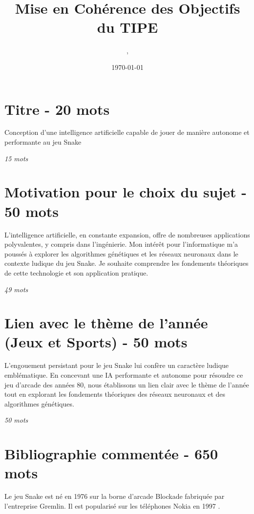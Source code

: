 \documentclass[11pt,a4paper]{article}
\author{\monNom, \maClasse}
\title{Mise en Cohérence des Objectifs du TIPE}
\date{\today}
\makeatletter
\renewcommand{\maketitle}{
  \thispagestyle{empty}
  \begin{center}
  \shadowbox{\parbox{5in}{%
     \centering%
     \textrm{\textbf{\Large \@title}}\\
     \vspace{0.2cm}
     \textrm{\large \@author}\\
     \vspace{0.2cm}
     \textrm{\large \@date}
  }} 
  \end{center}
  \null
}
\makeatother
\begin{document}
\maketitle

\tableofcontents

\thispagestyle{fancy}

\section{Titre - 20 mots}

\begin{center}
    Conception d'une intelligence artificielle capable de jouer de manière autonome et performante au jeu Snake  
\end{center}

\textit{15 mots}

\section{Motivation pour le choix du sujet - 50 mots}

L'intelligence artificielle, en constante expansion, offre de nombreuses applications polyvalentes, y compris dans l'ingénierie.
Mon intérêt pour l'informatique m'a poussés à explorer les algorithmes génétiques et les réseaux neuronaux dans le contexte ludique du jeu Snake.
Je souhaite comprendre les fondements théoriques de cette technologie et son application pratique.

\textit{49 mots}

\section{Lien avec le thème de l'année (Jeux et Sports) - 50 mots}

L'engouement persistant pour le jeu Snake lui confère un caractère ludique 
emblématique.
En concevant une IA performante et autonome pour résoudre ce jeu 
d'arcade des années 80, nous établissons un lien clair avec le thème de 
l'année tout en explorant les fondements théoriques des réseaux neuronaux et 
des algorithmes génétiques.

\textit{50 mots}

\section{Bibliographie commentée - 650 mots}

Le jeu Snake est né en 1976 sur la borne d'arcade Blockade fabriquée par l'entreprise Gremlin. Il est popularisé sur les téléphones Nokia en 1997 \cite{GoldenAgeArcadeHistorian2015}.
\end{document}

